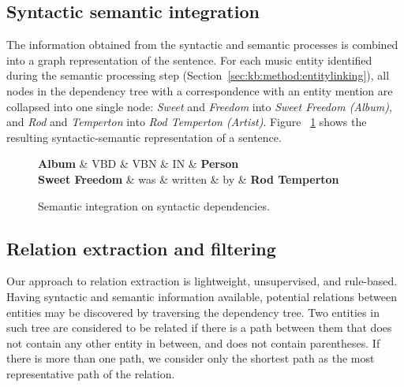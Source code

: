 \subsection{Syntactic semantic integration}
\label{sec:kb:method:syntsemint}

The information obtained from the syntactic and semantic processes is combined into a graph representation of the sentence. For each music entity identified during the semantic processing step (Section~\ref{sec:kb:method:entitylinking}), all nodes in the dependency tree with a correspondence with an entity mention are collapsed into one single node: \textit{Sweet} and \textit{Freedom} into \textit{Sweet Freedom (Album)}, and \textit{Rod} and \textit{Temperton} into \textit{Rod Temperton (Artist)}. Figure ~\ref{fig:kb:sampletree_combined} shows the resulting syntactic-semantic representation of a sentence.

\begin{figure}[!htb]
\centering
\begin{dependency}
\begin{deptext}[column sep=.0cm]
\textbf{Album} \& VBD \& VBN \& IN \& \textbf{Person} \\
\textbf{Sweet Freedom} \& was \& written \& by \& \textbf{Rod Temperton} \\
\end{deptext}



\end{dependency}
\vspace*{-5mm}
\caption{Semantic integration on syntactic dependencies.}
\label{fig:kb:sampletree_combined}
\end{figure}


\subsection{Relation extraction and filtering}
\label{sec:kb:method:re-filtering}

Our approach to relation extraction is lightweight, unsupervised, and rule-based. Having syntactic and semantic information available, potential relations between entities may be discovered by traversing the dependency tree.
Two entities in such tree are considered to be related if there is a path between them that does not contain any other entity in between, and does not contain parentheses. If there is more than one path, we consider only the shortest path as the most representative path of the relation.

